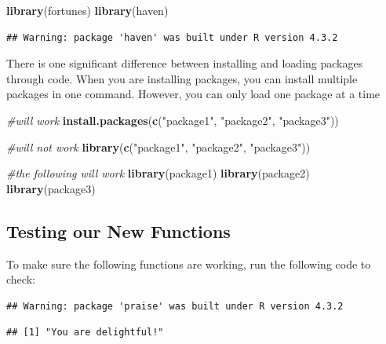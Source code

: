 \documentclass[
]{book}
\newenvironment{Shaded}{\begin{snugshade}}{\end{snugshade}}
\newcommand{\CommentTok}[1]{\textcolor[rgb]{0.56,0.35,0.01}{\textit{#1}}}
\newcommand{\FunctionTok}[1]{\textcolor[rgb]{0.13,0.29,0.53}{\textbf{#1}}}
\newcommand{\NormalTok}[1]{#1}
\newcommand{\StringTok}[1]{\textcolor[rgb]{0.31,0.60,0.02}{#1}}
\begin{document}
\begin{Shaded}
\begin{Highlighting}[]
\FunctionTok{library}\NormalTok{(fortunes)}
\FunctionTok{library}\NormalTok{(haven)}
\end{Highlighting}
\end{Shaded}

\begin{verbatim}
## Warning: package 'haven' was built under R version 4.3.2
\end{verbatim}

There is one significant difference between installing and loading packages through code. When you are installing packages, you can install multiple packages in one command. However, you can only load one package at a time

\begin{Shaded}
\begin{Highlighting}[]
\CommentTok{\#will work}
\FunctionTok{install.packages}\NormalTok{(}\FunctionTok{c}\NormalTok{(}\StringTok{"package1"}\NormalTok{, }\StringTok{"package2"}\NormalTok{, }\StringTok{"package3"}\NormalTok{)) }


\CommentTok{\#will not work}
\FunctionTok{library}\NormalTok{(}\FunctionTok{c}\NormalTok{(}\StringTok{"package1"}\NormalTok{, }\StringTok{"package2"}\NormalTok{, }\StringTok{"package3"}\NormalTok{)) }

\CommentTok{\#the following will work}
\FunctionTok{library}\NormalTok{(package1)}
\FunctionTok{library}\NormalTok{(package2)}
\FunctionTok{library}\NormalTok{(package3)}
\end{Highlighting}
\end{Shaded}

\hypertarget{testing-our-new-functions}{%
\subsection{Testing our New Functions}\label{testing-our-new-functions}}

To make sure the following functions are working, run the following code to check:

\begin{verbatim}
## Warning: package 'praise' was built under R version 4.3.2
\end{verbatim}

\begin{verbatim}
## [1] "You are delightful!"
\end{verbatim}
\end{document}
